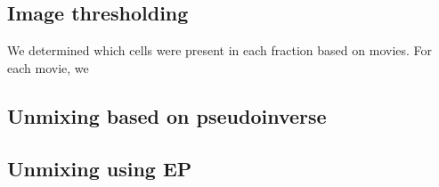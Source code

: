 \documentclass{article}
\begin{document}
\subsection*{Image thresholding}

We determined which cells were present in each fraction based on  movies.
For each movie, we 



\subsection*{Unmixing based on pseudoinverse}




\subsection*{Unmixing using EP}
\end{document}
